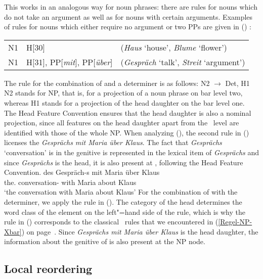 This works in an analogous way for noun phrases: there are rules for nouns which do not take an argument as well as for nouns with certain arguments. Examples of rules for 
nouns which either require no argument or two PPs are given in () \citep*[]{GKPS85a}:
\ea
\begin{tabular}[t]{@{}l@{~$\to$~}ll@{}}
N1 & H[30] & (\emph{Haus} `house', \emph{Blume} `flower')\\
N1 & H[31], PP[\emph{mit}], PP[\emph{über}] & (\emph{Gespräch} `talk', \emph{Streit} `argument')\\
\end{tabular}
\z
The rule for the combination of \nbar and a determiner is as follows:
\ea
N2 $\to$ Det, H1
\z
N2 stands for NP, that is, for a projection of a noun phrase on bar level two, whereas H1
stands for a projection of the head daughter on the bar level one.
The Head Feature Convention ensures that the head daughter is also a nominal projection, since all features on the head daughter apart from the \xbar~level 
are identified with those of the whole NP. When analyzing (), the second rule in () licenses the \nbar \emph{Gesprächs mit Maria
  über Klaus}. The fact that \emph{Gesprächs} `conversation' is in the genitive is represented in the lexical item of \emph{Gesprächs} and since \emph{Gesprächs}
  is the head, it is also present at \nbar, following the Head Feature Convention.
\ea
\gll des Gespräch-s mit Maria über Klaus\\
	 the.\gen{} conversation-\gen{} with Maria about Klaus\\
\glt `the conversation with Maria about Klaus'
\z
For the combination of \nbar with the determiner, we apply the rule in (). The category of
the head determines the word class of the element on the left"=hand side of the rule, which is why
the rule in () corresponds to the classical \xbar~rules that we encountered in (\ref{Regel-NP-Xbar}) on page~\pageref{Regel-NP-Xbar}. Since \emph{Gesprächs mit Maria über Klaus} is
the head daughter, the information about the genitive of \nbar is also present at the NP node.

\subsection{Local reordering}
\label{GPSG-lokale-Umstellung}\label{sec-IDLP-intro}

